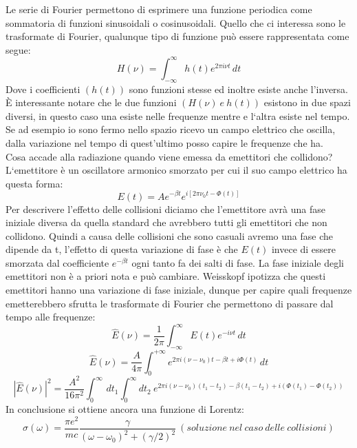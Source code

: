 \documentclass[a4paper,11pt]{article}
\begin{document}
    Le serie di Fourier permettono di esprimere una funzione periodica come sommatoria di funzioni sinusoidali o cosinusoidali. Quello che ci interessa sono le trasformate di Fourier, qualunque tipo di funzione può essere rappresentata come segue:
$$
H(\nu)=\int_{-\infty}^{\infty} h(t)e^{2\pi i \nu t} \,dt
$$
Dove i coefficienti \begin{math}
    (h(t))
\end{math} sono funzioni stesse ed inoltre esiste anche l’inversa. È interessante notare che le due funzioni \begin{math}
    (H(\nu)\ e\ h(t))
\end{math} esistono in due spazi diversi, in questo caso una esiste nelle frequenze mentre e l‘altra esiste nel tempo.\\
Se ad esempio io sono fermo nello spazio ricevo un campo elettrico che oscilla, dalla variazione nel tempo di quest’ultimo posso capire le frequenze che ha. \\
Cosa accade alla radiazione quando viene emessa da emettitori che collidono?	L‘emettitore è un oscillatore armonico smorzato per cui il suo campo elettrico ha questa forma:
$$
E(t)=Ae^{-\beta t}e^{i[2\pi \nu_0 t-\Phi(t)]}
$$
Per descrivere l’effetto delle collisioni diciamo che l’emettitore avrà una fase iniziale diversa da quella standard che avrebbero tutti gli emettitori che non collidono. Quindi a causa delle collisioni che sono casuali avremo una fase che dipende da t, l’effetto di questa variazione di fase è che \begin{math} E(t) \end{math} invece di essere smorzata dal coefficiente \begin{math} e^{-\beta t} \end{math} ogni tanto fa dei salti di fase. La fase iniziale degli emettitori non è a priori nota e può cambiare. Weisskopf ipotizza che questi emettitori hanno una variazione di fase iniziale, dunque per capire quali frequenze emetterebbero sfrutta le trasformate di Fourier che permettono di passare dal tempo alle frequenze:
$$
\hat{E}(\nu)=\frac{1}{2\pi}\int_{-\infty}^{\infty} E(t) e^{-i\nu t} \,dt$$
$$
\hat{E}(\nu)=\frac{A}{4\pi}\int_{0}^{+\infty} e^{2\pi i(\nu-\nu_0)t-\beta t+i \Phi(t)}\, dt
$$
$$
|\hat{E}(\nu)|^2=\frac{A^2}{16 \pi^2}\int_{0}^{\infty}\, dt_1 \int_{0}^{\infty}dt_2\ e^{2\pi i(\nu-\nu_0)(t_1-t_2)-\beta (t_1-t_2)+i (\Phi(t_1)-\Phi(t_2))}
$$
In conclusione si ottiene ancora una funzione di Lorentz:
$$
\sigma(\omega)=\frac{\pi e^2}{mc}\frac{\gamma}{(\omega-\omega_0)^2+(\gamma/2)^2}\ (soluzione\ nel\ caso\ delle\ collisioni)
$$
\end{document}
